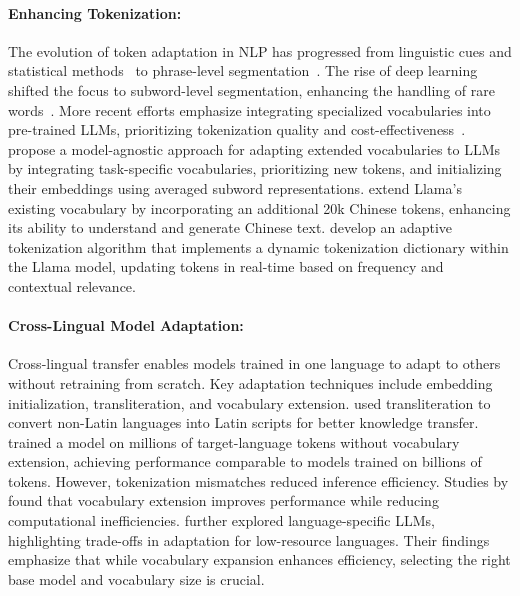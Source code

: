 \paragraph{Enhancing Tokenization:}
The evolution of token adaptation in NLP has progressed from linguistic cues and statistical methods~\cite{creutz2006morfessor, luong2013better, zhang2023ask} to phrase-level segmentation~\cite{koehn2007moses, koehn2003statistical}. The rise of deep learning shifted the focus to subword-level segmentation, enhancing the handling of rare words~\cite{sennrich2015neural, kudo2018subword, kudo-richardson-2018-sentencepiece}. More recent efforts emphasize integrating specialized vocabularies into pre-trained LLMs, prioritizing tokenization quality and cost-effectiveness~\cite{ahia2023all, zhang2023ask, zhang2024counting, tejaswi2024exploring}.
\citet{liu2023task} propose a model-agnostic approach for adapting extended vocabularies to LLMs by integrating task-specific vocabularies, prioritizing new tokens, and initializing their embeddings using averaged subword representations. \citet{cui2023efficient} extend Llama's existing vocabulary by incorporating an additional 20k Chinese tokens, enhancing its ability to understand and generate Chinese text. \citet{chiappeoptimizing} develop an adaptive tokenization algorithm that implements a dynamic tokenization dictionary within the Llama model, updating tokens in real-time based on frequency and contextual relevance.


\noindent
\paragraph{Cross-Lingual Model Adaptation:}
Cross-lingual transfer enables models trained in one language to adapt to others without retraining from scratch. Key adaptation techniques include embedding initialization, transliteration, and vocabulary extension.
\citet{jaavid2024romansetu} used transliteration to convert non-Latin languages into Latin scripts for better knowledge transfer. \citet{zhao2024llama} trained a model on millions of target-language tokens without vocabulary extension, achieving performance comparable to models trained on billions of tokens. However, tokenization mismatches reduced inference efficiency.
Studies by \citet{csaki2023efficiently, cui2023efficient, raffel2020exploring, lin2024mala} found that vocabulary extension improves performance while reducing computational inefficiencies. \citet{tejaswi2024exploring} further explored language-specific LLMs, highlighting trade-offs in adaptation for low-resource languages. Their findings emphasize that while vocabulary expansion enhances efficiency, selecting the right base model and vocabulary size is crucial.

